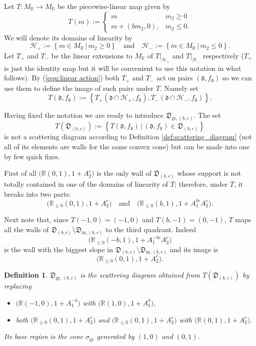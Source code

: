 \documentclass[11pt]{amsart}
\newtheorem{defn}[theorem]{Definition}
\theoremstyle{remark}
\numberwithin{equation}{section}
\newcommand{\RR}{\mathbb{R}}
\newcommand{\fd}{\mathfrak{d}}
\newcommand{\fD}{\mathfrak{D}}
\newcommand{\gr}{\mathrm{gr}}
\begin{document}
Let $T:M_\RR\rightarrow M_\RR$ be the piecewise-linear map given by
\[
  T (m) := 
  \begin{cases}
    m   & m_2 \geq 0 \\
    m + (bm_2,0), & m_2 \leq 0.
  \end{cases}
\]
We will denote its domains of linearity by 
\[ 
  \mathcal{H}_{+} := 
  \left\{ m \in M_{\mathbb{R}}\, |\, m_2 \geq 0 \right\} 
  \quad
  \mbox{and}
  \quad
  \mathcal{H}_{-} := 
  \left\{ m \in M_{\mathbb{R}} \,|\, m_2 \leq 0 \right\}.
\]
Let $T_+$ and $T_-$ be the linear extensions to $M_\RR$ of $T|_{\mathcal{H}_+}$
and $T|_{\mathcal{H}_-}$ respectively ($T_+$ is just the identity map but it
will be convenient to use this notation in what follows). 
By (\ref{eqn:linear action}) both $T_+$ and $T_-$ act on pairs $(\fd,f_\fd)$ so
we can use them to define the image of such pairs under $T$. Namely set
\[
  T(\fd,f_\fd):=
  \left\{
    T_+\left(\fd\cap\mathcal{H}_+,f_\fd\right),
    T_-\left(\fd\cap\mathcal{H}_-,f_\fd\right)
  \right\}.
\]

Having fixed the notation we are ready to introduce $\fD_{\mathrm{gr},(b,c)}$.
The set
\[
  T(\fD_{(b,c)}):=
  \left\{
    T(\fd,f_\fd)\, |\, (\fd,f_\fd)\in \fD_{(b,c)}
  \right\}
\]
is not a scattering diagram according to Definition 
\ref{def:scattering_diagram} (not all of its elements are walls for the same
convex cone) but can be made into one by few quick fixes.

First of all $\big( \RR (0,1), 1+A_2^c\big)$ is the only wall of $\fD_{(b,c)}$
whose support is not totally contained in one of the domains of linearity of
$T$; therefore, under $T$, it breaks into two parts:
\[
  \big( \RR_{\ge0} (0,1), 1+A_2^c\big)
  \quad
  \mbox{and}
  \quad
  \big( \RR_{\le 0} (b,1), 1+A_1^{bc}A_2^c\big).
\]

Next note that, since $T(-1,0)=(-1,0)$ and $T(b,-1)=(0,-1)$, $T$ maps all the
walls of $\fD_{(b,c)}\setminus\fD_{\mathrm{in},(b,c)}$ to the third quadrant. 
Indeed 
\[
  \big(\RR_{\leq0}(-b,1),1+A_1^{-bc}A_2^c\big)
\]
is the wall with the biggest slope in
$\fD_{(b,c)}\setminus\fD_{\mathrm{in},(b,c)}$ and its image is 
\[
  \big( \RR_{\le0} (0,1), 1+A_2^c\big).
\]

\begin{defn}
  $\fD_{\gr,(b,c)}$ is the scattering diagram obtained from
  $T\left(\fD_{(b,c)}\right)$ by replacing 
  \begin{itemize}
    \item
      $\big(\RR (-1,0), 1+A_1^{-b}\big)$ with $\big(\RR  (1,0), 1+A_1^b\big)$,
    \item 
      both $ \big( \RR_{\ge0} (0,1), 1+A_2^c\big)$ and $\big( \RR_{\le0} (0,1),
      1+A_2^c\big)$ with $ \big( \RR (0,1), 1+A_2^c\big)$.
  \end{itemize}
  Its base region is the cone $\sigma_\gr$ generated by $(1,0)$ and $(0,1)$.
\end{defn}
\end{document}
